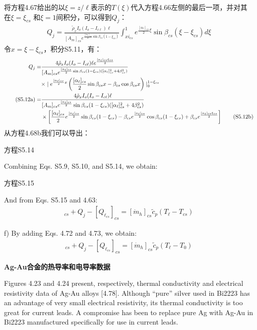 将方程4.67给出的以$\xi=z/\ell$表示的$T(\xi)$代入方程4.66左侧的最后一项，并对其在$\xi=\xi_{cs}$
和$\xi=1$间积分，可以得到$Q_j$：
\begin{align*}
	Q_j=\frac{\tilde{\rho}_x I_o(I_o-I_{c\ell})\ell}{[A_m]_{cs}e^{\frac{[\alpha_\ell]_{cs}}{2}\sin\beta_{cs}(1-\xi_{cs})}}\int_{xi_{cs}}^{1} e^{\frac{[\alpha_\ell]_{cs}}{2}\xi}\sin\beta_{cs}(\xi-\xi_{cs})d\xi \tag{S5.11}
\end{align*}
令$x=\xi-\xi_{cs}$，积分S5.11，有：
\begin{subequations}
\begin{align*}
Q_j=&
\frac{4\tilde{\rho}_xI_o(I_o-I_{c\ell})\ell e^{\frac{[\alpha_\ell]_{cs}\xi_{cs}}{2}}}{[A_m]_{cs}e^{\frac{[\alpha_\ell]_{cs}}{2}\sin\beta_{cs}(1-\xi_{cs})([\alpha_\ell]_{cs}^{2}+4\beta_{cs}^{2})}} \\\notag
&\times\mid e^{\frac{[\alpha_\ell]_{cs}}{2}x}\left(\frac{[\alpha_\ell]_{cs}}{2}\sin\beta_{cs}x-\beta_{cs}\cos\beta_{cs}x\right)\mid_{0}^{1-\xi_{cs}} \\\tag{S5.12a}
=&\frac{4\tilde{\rho}_xI_o(I_o-I_{c\ell})\ell}{[A_m]_{cs}e^{\frac{[\alpha_\ell]_{cs}}{2}}\sin\beta_{cs}(1-\xi_{cs})([\alpha_\ell]_{cs}^{2}+4\beta_{cs}^{2})} \\\notag
&\times\left[\frac{[\alpha_\ell]_{cs}}{2}e^{\frac{[\alpha_\ell]_{cs}}{2}}\sin\beta_{cs}(1-\xi_{cs})-\beta_{cs}e^{\frac{[\alpha_\ell]_{cs}}{2}}\cos\beta_{cs}(1-\xi_{cs})+\beta_{cs}e^{\frac{[\alpha_\ell]_{cs}\xi_{cs}}{2}}\right] \tag{S5.12b}
\end{align*}
\end{subequations}
从方程4.68b我们可以导出：

方程S5.14

Combining Eqs. S5.9, S5.10, and S5.14, we obtain:

方程S5.15

And from Eqs. S5.15 and 4.63:
\begin{align*}%
[Q_\ell]_{cs}+Q_j-[Q_{\ell_{cs}}]_{cs}=[\dot{m}_h]_{cs}\tilde{c}_p(T_\ell-T_{cs}) \tag{4.73}
\end{align*}

f) By adding Eqs. 4.72 and 4.73, we obtain:
\begin{align*}%
[Q_\ell]_{cs}+Q_j-[Q_{\ell_{cs}}]_{cs}=[\dot{m}_h]_{cs}\tilde{c}_p(T_\ell-T_0) \tag{4.74}
\end{align*}

\textbf{Ag-Au合金的热导率和电导率数据}

Figures 4.23 and 4.24 present, respectively, thermal conductivity and electrical
resistivity data of Ag-Au alloys [4.78]. Although “pure” silver used in Bi2223 has
an advantage of very small electrical resistivity, its thermal conductivity is too
great for current leads. A compromise has been to replace pure Ag with Ag-Au
in Bi2223 manufactured specifically for use in current leads.

